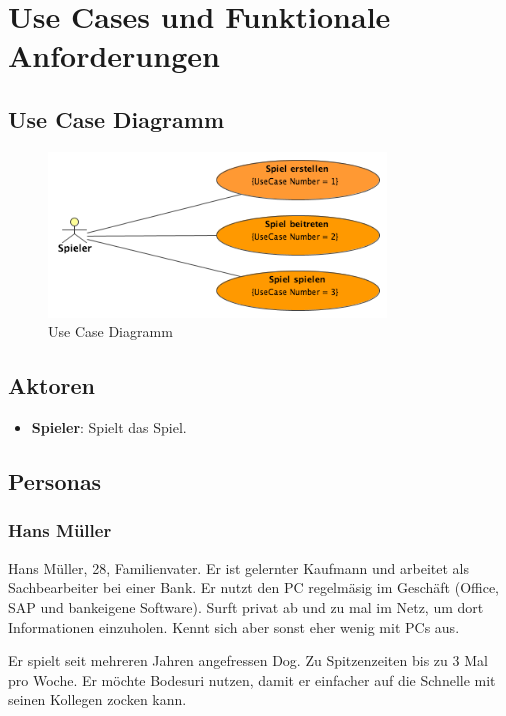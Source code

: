 \documentclass[a4paper,12pt,halfparskip,DIV14]{scrartcl}
\begin{document}


\section{Use Cases und Funktionale Anforderungen} 
\subsection{Use Case Diagramm}\label{sub:use_case_diagramm} 
\begin{figure}
	[htp] \centering 
	\includegraphics[width=0.8\textwidth]{UseCaseDiagramm.png} \caption{Use Case Diagramm}\label{fig:UseCaseDiagramm.png} 
\end{figure}

\subsection{Aktoren}\label{sec:aktoren} 
\begin{itemize}
	\item \textbf{Spieler}: Spielt das Spiel. 
\end{itemize}

\subsection{Personas}\label{sec:personas} 

\subsubsection{Hans Müller}\label{sub:hans_müller} 

Hans Müller, 28, Familienvater. Er ist gelernter Kaufmann und arbeitet als Sachbearbeiter bei einer Bank. Er nutzt den PC regelmäsig im Geschäft (Office, SAP und bankeigene Software). Surft privat ab und zu mal im Netz, um dort Informationen einzuholen. Kennt sich aber sonst eher wenig mit PCs aus. 

Er spielt seit mehreren Jahren angefressen Dog. Zu Spitzenzeiten bis zu 3 Mal pro Woche. Er möchte Bodesuri nutzen, damit er einfacher auf die Schnelle mit seinen Kollegen zocken kann. 
\end{document}
